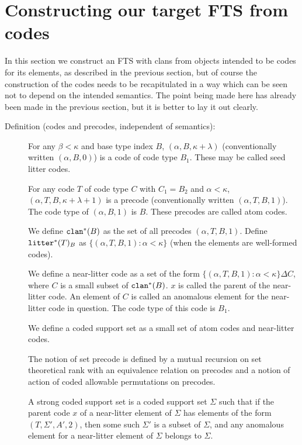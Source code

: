 \documentclass{article}
\begin{document}
\newpage

\section{Constructing our target FTS from codes}

In this section we construct an FTS with clans from objects intended to be codes for its elements, as described in the previous section, but of course the construction of the codes needs to be recapitulated in a way which can be seen not to depend on the intended semantics.   The point being made here has already been made in the previous section, but it is better to lay it out clearly.

\begin{description}

\item[Definition (codes and precodes, independent of semantics):]

For any $\beta<\kappa$ and base type index $B$,  $(\alpha,B,\kappa+\lambda)$ (conventionally written $(\alpha,B,0)$) is a code of code type $B_1$.  These may be called seed litter codes.

For any code $T$ of code type $C$ with $C_1=B_2$ and $\alpha<\kappa$, $(\alpha,T,B,\kappa+\lambda+1)$ is a precode (conventionally written $(\alpha,T,B,1)$).   The code type of $(\alpha,B,1)$ is $B$.  These precodes are called atom codes.

We define ${\tt clan}^*(B)$ as the set of all precodes $(\alpha,T,B,1)$.  Define ${\tt litter}^*(T)_B$ as $\{(\alpha,T,B,1):\alpha<\kappa\}$ (when the elements are well-formed codes).

We define a near-litter code as a set of the form $\{(\alpha,T,B,1):\alpha<\kappa\} \Delta C$, where $C$ is a small subset of ${\tt clan}^*(B)$.  $x$ is called the parent of the near-litter code.  An element of $C$ is called an anomalous element for the near-litter code in question.  The code type of this code is $B_1$.

We define a coded support set as a small set of atom codes and near-litter codes.

The notion of set precode is defined by a mutual recursion on set theoretical rank with an equivalence relation on precodes and a notion of action of coded allowable permutations on precodes.

A strong coded support set is a coded support set $\Sigma$ such that if the parent code $x$ of a near-litter element of $\Sigma$ has elements of the form
$(T,\Sigma',A',2)$, then some such $\Sigma'$ is a subset of $\Sigma$, and any anomalous element for a near-litter element of $\Sigma$ belongs to $\Sigma$.


\end{description}
\end{document}
